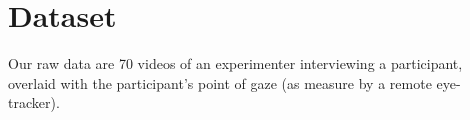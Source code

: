 \documentclass{llncs}
\begin{document}
\vspace{-1.5em} 
\section{Dataset}
\vspace{-1.5em} 
Our raw data are 70 videos of an experimenter interviewing a participant, overlaid with the participant's point of gaze (as measure by a remote eye-tracker).%
\vspace*{-\baselineskip}
\end{document}
